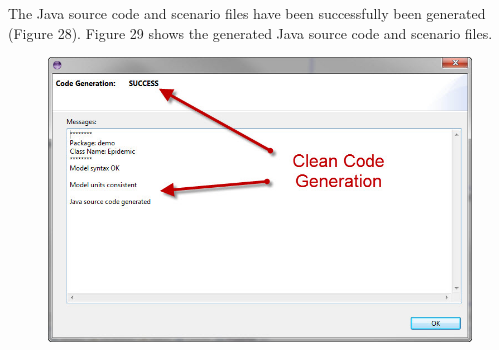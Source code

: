\documentclass[11pt]{amsart}
\begin{document}
The Java source code and scenario files have been successfully been generated (Figure 28). Figure 29 shows the generated Java source code and scenario files.

\begin{figure}[ht]
\begin{center}
\vspace{.2in}
\centerline {
\includegraphics[totalheight=0.3\textheight]{images/026.jpg}
}
\caption{}
\label{fig:026}
\end{center}
\end{figure}
\end{document}
